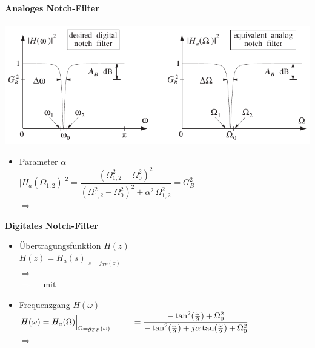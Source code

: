 	\begin{minipage}{0.48\textwidth}
		\textbf{\large{Analoges Notch-Filter}}\\[0.2cm]
		\\[0.2cm]
		\includegraphics[width = \textwidth]{pic/Notch2ordnung.pdf}\\[-0.5cm]
		\begin{itemize}
		 \item Parameter $\alpha$\\[0.1cm]
		 $\big|H_a(\Omega_{1,2})\big|^2 = \dfrac{(\Omega_{1,2}^2-\Omega_0^2)^2}{(\Omega_{1,2}^2-\Omega_0^2)^2+\alpha^2\,\Omega_{1,2}^2} = G_B^2$\\[0.2cm]
		 $\Rightarrow\quad\;$\\[0.25cm]
		\end{itemize}
		\textbf{\large{Digitales Notch-Filter}}\\[-0.3cm]
		\begin{itemize}
		 \item Übertragungsfunktion $H(z)$\\[0.1cm]
		 $H(z) = H_a(s)\Big|_{s=f_{TP}(z)}$\\[0.2cm]
		 $\Rightarrow\quad$$\quad$\\[0.2cm]
		 \textcolor{white}{$\Rightarrow\quad\;$}mit$\quad$\\[0.1cm]
		 \item Frequenzgang $H(\omega)$\\[0.2cm]
		 $H(\omega) = H_a(\Omega)\Big|_{\Omega=g_{TP}(\omega)}\\[0.2cm]
		 \hspace*{0.9cm}=\dfrac{-\tan^2(\frac{\omega}{2}) + \Omega_0^2}{-\tan^2(\frac{\omega}{2})+j\alpha\tan(\frac{\omega}{2})+ \Omega_0^2}$\\[0.25cm]
		 $\Rightarrow\quad\;$
		\end{itemize}
	\end{minipage}
